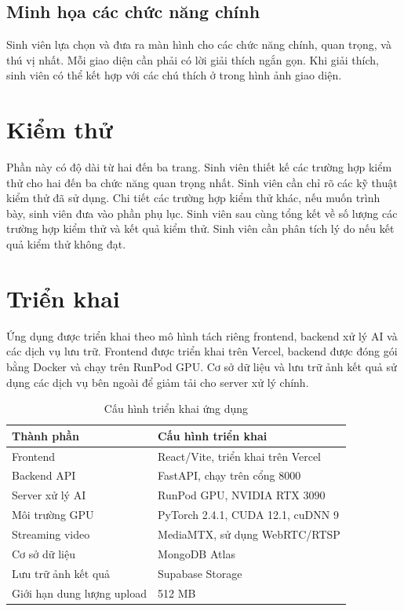 \documentclass[../DoAn.tex]{subfiles}
\begin{document}
\subsection{Minh họa các chức năng chính}
Sinh viên lựa chọn và đưa ra màn hình cho các chức năng chính, quan trọng, và thú vị nhất. Mỗi giao diện cần phải có lời giải thích ngắn gọn. Khi giải thích, sinh viên có thể kết hợp với các chú thích ở trong hình ảnh giao diện.

\section{Kiểm thử}
Phần này có độ dài từ hai đến ba trang. Sinh viên thiết kế các trường hợp kiểm thử cho hai đến ba chức năng quan trọng nhất. Sinh viên cần chỉ rõ các kỹ thuật kiểm thử đã sử dụng. Chi tiết các trường hợp kiểm thử khác, nếu muốn trình bày, sinh viên đưa vào phần phụ lục.
Sinh viên sau cùng tổng kết về số lượng các trường hợp kiểm thử và kết quả kiểm thử. Sinh viên cần phân tích lý do nếu kết quả kiểm thử không đạt.
\section{Triển khai}

Ứng dụng được triển khai theo mô hình tách riêng frontend, backend xử lý AI và các dịch vụ lưu trữ. Frontend được triển khai trên Vercel, backend được đóng gói bằng Docker và chạy trên RunPod GPU. Cơ sở dữ liệu và lưu trữ ảnh kết quả sử dụng các dịch vụ bên ngoài để giảm tải cho server xử lý chính.

\begin{table}[H]
\centering
\begin{tabular}{p{4cm} p{10cm}}
\hline
\textbf{Thành phần} & \textbf{Cấu hình triển khai} \\ \hline
Frontend & React/Vite, triển khai trên Vercel \\ \hline
Backend API & FastAPI, chạy trên cổng 8000 \\ \hline
Server xử lý AI & RunPod GPU, NVIDIA RTX 3090 \\ \hline
Môi trường GPU & PyTorch 2.4.1, CUDA 12.1, cuDNN 9 \\ \hline
Streaming video & MediaMTX, sử dụng WebRTC/RTSP \\ \hline
Cơ sở dữ liệu & MongoDB Atlas \\ \hline
Lưu trữ ảnh kết quả & Supabase Storage \\ \hline
Giới hạn dung lượng upload & 512 MB \\ \hline
\end{tabular}
\caption{Cấu hình triển khai ứng dụng}
\label{table:deployment_config}
\end{table}
\end{document}
